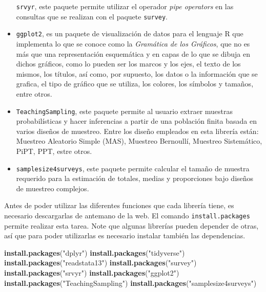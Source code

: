 \documentclass[
  12pt,
]{book}
\newenvironment{Shaded}{\begin{snugshade}}{\end{snugshade}}
\newcommand{\FunctionTok}[1]{\textcolor[rgb]{0.13,0.29,0.53}{\textbf{#1}}}
\newcommand{\NormalTok}[1]{#1}
\newcommand{\StringTok}[1]{\textcolor[rgb]{0.31,0.60,0.02}{#1}}
\begin{document}
\begin{itemize}
  \texttt{srvyr}, este paquete permite utilizar el operador \emph{pipe operators} en las consultas que se realizan con el paquete \texttt{survey}.
\item
  \texttt{ggplot2}, es un paquete de visualización de datos para el lenguaje R que implementa lo que se conoce como la \emph{Gramática de los Gráficos}, que no es más que una representación esquemática y en capas de lo que se dibuja en dichos gráficos, como lo pueden ser los marcos y los ejes, el texto de los mismos, los títulos, así como, por supuesto, los datos o la información que se grafica, el tipo de gráfico que se utiliza, los colores, los símbolos y tamaños, entre otros.
\item
  \texttt{TeachingSampling}, este paquete permite al usuario extraer muestras probabilísticas y hacer inferencias a partir de una población finita basada en varios diseños de muestreo. Entre los diseño empleados en esta librería están: Muestreo Aleatorio Simple (MAS), Muestreo Bernoullí, Muestreo Sistemático, PiPT, PPT, estre otros.
\item
  \texttt{samplesize4surveys}, este paquete permite calcular el tamaño de muestra requerido para la estimación de totales, medias y proporciones bajo diseños de muestreo complejos.
\end{itemize}

Antes de poder utilizar las diferentes funciones que cada librería tiene, es necesario descargarlas de antemano de la web. El comando \texttt{install.packages} permite realizar esta tarea. Note que algunas librerías pueden depender de otras, así que para poder utilizarlas es necesario instalar también las dependencias.

\begin{Shaded}
\begin{Highlighting}[]
\FunctionTok{install.packages}\NormalTok{(}\StringTok{"dplyr"}\NormalTok{)}
\FunctionTok{install.packages}\NormalTok{(}\StringTok{"tidyverse"}\NormalTok{)}
\FunctionTok{install.packages}\NormalTok{(}\StringTok{"readstata13"}\NormalTok{) }
\FunctionTok{install.packages}\NormalTok{(}\StringTok{"survey"}\NormalTok{)}
\FunctionTok{install.packages}\NormalTok{(}\StringTok{"srvyr"}\NormalTok{)}
\FunctionTok{install.packages}\NormalTok{(}\StringTok{"ggplot2"}\NormalTok{)}
\FunctionTok{install.packages}\NormalTok{(}\StringTok{"TeachingSampling"}\NormalTok{)}
\FunctionTok{install.packages}\NormalTok{(}\StringTok{"samplesize4surveys"}\NormalTok{)}
\end{Highlighting}
\end{Shaded}
\end{document}
